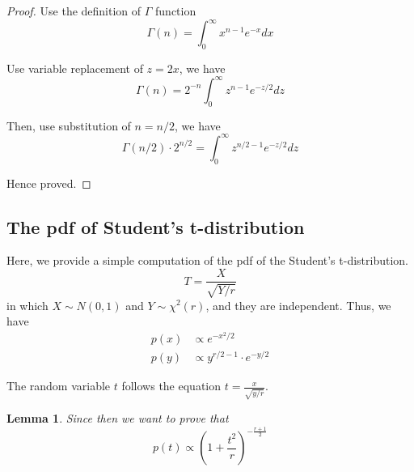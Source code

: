 \documentclass[a4paper]{article}
\newtheorem{lemma}{Lemma}[section]
\begin{document}
\begin{proof}
    Use the definition of $\Gamma$ function
    \begin{equation*}
        \Gamma(n) = \int_0^\infty x^{n-1} e^{-x} dx
    \end{equation*}

    Use variable replacement of $z = 2x$, we have
    \begin{equation*}
        \Gamma(n) = 2^{-n} \int_0^\infty z^{n-1} e^{-z/2} dz
    \end{equation*}

    Then, use substitution of $n = n/2$, we have
    \begin{equation*}
        \Gamma(n/2) \cdot 2^{n/2} = \int_0^\infty z^{n/2-1} e^{-z/2} dz
    \end{equation*}

    Hence proved.

\end{proof}

\subsection{The pdf of Student's t-distribution}

Here, we provide a simple computation of the pdf of the Student's t-distribution.
\begin{equation*}
    T=\frac{X}{\sqrt{Y/r}}
\end{equation*}
in which $X \sim N(0, 1)$ and $Y \sim \chi^2(r)$, and they are independent.
Thus, we have
\begin{equation*}
    \begin{aligned}
        p(x) & \propto e^{-x^2/2}               \\
        p(y) & \propto y^{r/2-1} \cdot e^{-y/2}
    \end{aligned}
\end{equation*}

The random variable $t$ follows the equation $t=\frac{x}{\sqrt{y/r}}$.

\begin{lemma} \label{lemma: Compute the pdf of Student's t-distribution}
    Since then we want to prove that
    \begin{equation*}
        p(t) \propto (1+\frac{t^2}{r})^{-\frac{r+1}{2}}
    \end{equation*}

\end{lemma}
\end{document}
